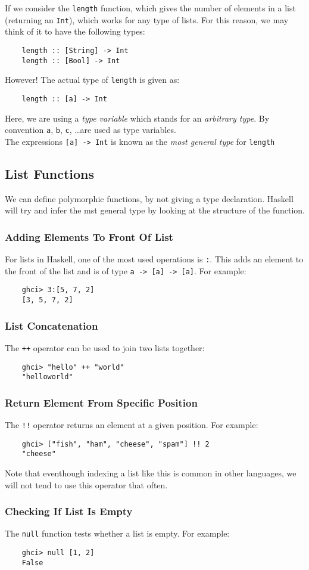 If we consider the \verb|length| function, which gives the number of elements in a list (returning an \verb|Int|), which works for any type of lists. For this reason, we may think of it to have the following types:
\begin{verbatim}
    length :: [String] -> Int
    length :: [Bool] -> Int
\end{verbatim}
However! The actual type of \verb|length| is given as:
\begin{verbatim}
    length :: [a] -> Int
\end{verbatim}
Here, we are using a \textit{type variable} which stands for an \textit{arbitrary type}. By convention \verb|a|, \verb|b|, \verb|c|, \ldots are used as type variables.\\

The expressions \verb|[a] -> Int| is known as the \textit{most general type} for \verb|length|

\subsection{List Functions}
We can define polymorphic functions, by not giving a type declaration. Haskell will try and infer the mst general type by looking at the structure of the function.

\subsubsection{Adding Elements To Front Of List}
For lists in Haskell, one of the most used operations is \verb|:|. This adds an element to the front of the list and is of type \verb|a -> [a] -> [a]|.  For example:
\begin{verbatim}
    ghci> 3:[5, 7, 2]
    [3, 5, 7, 2]
\end{verbatim}

\subsubsection{List Concatenation}
The \verb|++| operator can be used to join two lists together:
\begin{verbatim}
    ghci> "hello" ++ "world"
    "helloworld"
\end{verbatim}

\subsubsection{Return Element From Specific Position}
The \verb|!!| operator returns an element at a given position. For example:
\begin{verbatim}
    ghci> ["fish", "ham", "cheese", "spam"] !! 2
    "cheese"
\end{verbatim}
Note that eventhough indexing a list like this is common in other languages, we will not tend to use this operator that often.

\subsubsection{Checking If List Is Empty}
The \verb|null| function tests whether a list is empty. For example:
\begin{verbatim}
    ghci> null [1, 2]
    False
\end{verbatim}